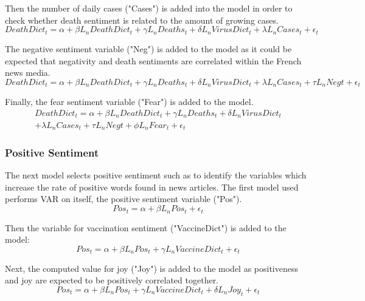 Then the number of daily cases ("Cases") is added into the model in order to check whether death sentiment is related to the amount of growing cases.
\begin{equation}
    DeathDict_{t} = \alpha + \beta L_{n} DeathDict_{t} + \gamma L_{n} Deaths_{t} + \delta L_{n} VirusDict_{t} + \lambda L_{n} Cases_{t} + \epsilon_{t}
\end{equation}

The negative sentiment variable ("Neg") is added to the model as it could be expected that negativity and death sentiments are correlated within the French news media.
\begin{equation}
    DeathDict_{t} = \alpha + \beta L_{n} DeathDict_{t} + \gamma L_{n} Deaths_{t} + \delta L_{n} VirusDict_{t} + \lambda L_{n} Cases_{t} + \tau L_{n} Neg{t} + \epsilon_{t}
\end{equation}

Finally, the fear sentiment variable ("Fear") is added to the model.
\begin{multline}
    DeathDict_{t} = \alpha + \beta L_{n} DeathDict_{t} + \gamma L_{n} Deaths_{t} + \delta L_{n} VirusDict_{t} \\ + \lambda L_{n} Cases_{t} + \tau L_{n} Neg{t} + \phi L_{n} Fear_{t} + \epsilon_{t}
\end{multline}
\subsubsection{Positive Sentiment}

The next model selects positive sentiment such as to identify the variables which increase the rate of positive words found in news articles. The first model used performs VAR on itself, the positive sentiment variable ("Pos").
\begin{equation}
    Pos_{t} = \alpha + \beta L_{n} Pos_{t} + \epsilon_{t}
\end{equation}

Then the variable for vaccination sentiment ("VaccineDict") is added to the model:
\begin{equation}
    Pos_{t} = \alpha + \beta L_{n} Pos_{t} + \gamma L_{n} VaccineDict_{t} + \epsilon_{t}
\end{equation}

Next, the computed value for joy ("Joy") is added to the model as positiveness and joy are expected to be positively correlated together.
\begin{equation}
    Pos_{t} = \alpha + \beta L_{n} Pos_{t} + \gamma L_{n} VaccineDict_{t} + \delta L_{n} Joy_{t} + \epsilon_{t}
\end{equation}

